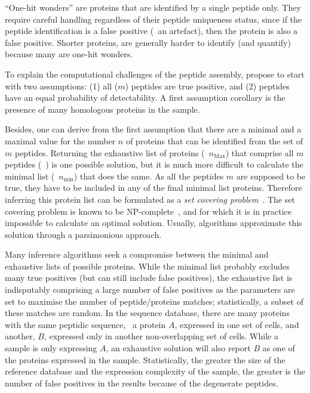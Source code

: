 \enquote{One-hit wonders} are proteins
that are identified by a single peptide only.
They require careful handling regardless of their peptide uniqueness status,
since if the peptide identification is a false positive (\ie\ an artefact),
then the protein is also a false positive.
Shorter proteins,
are generally harder to identify (and quantify)
because many are one-hit wonders.

To explain the computational challenges of the peptide assembly,
\citet{Huang2012-nr} propose to start with two assumptions:
(1) all ($m$) peptides are true positive,
and (2) peptides have an equal probability of detectability.
A first assumption corollary is
the presence of many homologous proteins in the sample.

Besides, one can derive from the first assumption
that there are a minimal and a maximal value
for the number $n$ of proteins that can be identified
from the set of $m$ peptides.
Returning the exhaustive list of proteins (\ie\ $n_\text{Max}$)
that comprise all $m$ peptides (\eg\ \citet{Tabb2002-wm}) is one possible solution,
but it is much more difficult to calculate the minimal list
(\ie\ $n_\text{min}$) that does the same.
As all the peptides $m$ are supposed to be true,
they have to be included in any of the final minimal list proteins.
Therefore inferring this protein list can be formulated
as a \emph{set covering problem}~.
The set covering problem is known to be \gls{NP}-complete~,
and for which it is in practice impossible to calculate an optimal solution.
Usually, algorithms approximate this solution through a parsimonious approach.

Many inference algorithms seek
a compromise between the minimal and exhaustive lists of possible proteins.
While the minimal list probably excludes many true positives
(but can still include false positives),
the exhaustive list is indisputably comprising a large number of false positives
as the parameters are set to maximise the number of peptide/proteins matches;
statistically, a subset of these matches are random.
In the sequence database,
there are many proteins with the same peptidic sequence,
\eg\ a protein $A$, expressed in one set of cells, and
another, $B$, expressed only in another non-overlapping set of cells.
While a sample is only expressing $A$,
an exhaustive solution will also report
$B$ as one of the proteins expressed in the sample.
Statistically,
the greater the size of the reference database
and the expression complexity of the sample,
the greater is the number of false positives in the results
because of the degenerate peptides.


